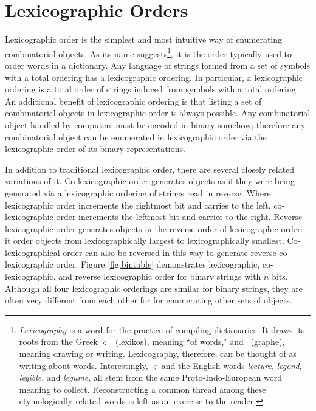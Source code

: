 \section{Lexicographic Orders}
    Lexicographic order is the simplest and most intuitive way of enumerating combinatorial objects.  As its name suggests\footnote{\emph{Lexicography} is a word for the practice of compiling dictionaries.  It draws its roots from the Greek \textlambda\textepsilon\textxi\textiota\textkappa\textomikron$\varsigma$ \ (lexikos), meaning ``of words," and \textgamma\textrho\textalpha\textphi\texteta \  (graphe), meaning drawing or writing.  Lexicography, therefore, can be thought of as writing about words.  Interestingly, \textlambda\textepsilon\textxi\textiota\textkappa\textomikron$\varsigma$ and the English words \emph{lecture}, \emph{legend}, \emph{legible}, and \emph{legume}, all stem from the same Proto-Indo-European word meaning to collect.  Reconstructing a common thread among these etymologically related words is left as an exercise to the reader.}, it is the order typically used to order words in a dictionary.  Any language of strings formed from a set of symbols with a total ordering has a lexicographic ordering.  In particular, a lexicographic ordering is a total order of strings induced from symbols with a total ordering.  An additional benefit of lexicographic ordering is that listing a set of combinatorial objects in lexicographic order is always possible. Any combinatorial object handled by computers must be encoded in binary somehow; therefore any combinatorial object can be enumerated in lexicographic order via the lexicographic order of its binary representations. 


In addition to traditional lexicographic order, there are several closely related variations of it. Co-lexicographic order generates objects as if they were being generated via a lexicographic ordering of strings read in reverse.  Where lexicographic order increments the rightmost bit and carries to the left, co-lexicographic order increments the leftmost bit and carries to the right. Reverse lexicographic order generates objects in the reverse order of lexicographic order: it order objects from lexicographically largest to lexicographically smallest. Co-lexicographical order can also be reversed in this way to generate reverse co-lexicographic order. Figure \ref{fig:bintable} demonstrates lexicographic, co-lexicographic, and reverse lexicographic order for binary strings with $n$ bits.  Although all four lexicographic orderings are similar for binary strings, they are often very different from each other for for enumerating other sets of objects.

